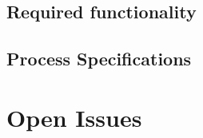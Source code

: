 \documentclass[10pt,a4paper]{exam}
\begin{document}
\subsection{Required functionality}
\lipsum[8]
\subsection{Process Specifications}
\lipsum[9]

\section{Open Issues}
\lipsum[10]
%
%
\end{document}
